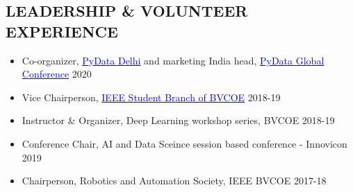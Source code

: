 \documentclass[11pt]{res} %
\newcommand{\titlegap}{5pt} %
\newcommand{\sectgap}{0.05in} %
\begin{document}
\begin{resume}
\section{LEADERSHIP \& VOLUNTEER EXPERIENCE}
\vspace{0.25in}
\begin{itemize}
    \item Co-organizer, \href{https://pydata.org/}{\textcolor{blue}{PyData Delhi}} and marketing India head, \href{https://global.pydata.org}{\textcolor{blue}{PyData Global Conference}} \hfill 2020
    \item Vice Chairperson, \href{https://site.ieee.org/sb-bvcoend/}{\textcolor{blue}{IEEE Student Branch of BVCOE}} \hfill 2018-19
    \item Instructor \& Organizer, Deep Learning workshop series, BVCOE \hfill 2018-19
    
    \item Conference Chair, AI and Data Sceince session based conference - Innovicon
    \hfill 2019
    \item Chairperson, Robotics and Automation Society, IEEE BVCOE \hfill 2017-18
\end{itemize}


\vspace{\sectgap} 
\hline








\end{resume}
\end{document}
